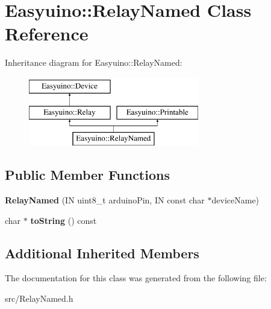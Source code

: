 \hypertarget{class_easyuino_1_1_relay_named}{}\section{Easyuino\+:\+:Relay\+Named Class Reference}
\label{class_easyuino_1_1_relay_named}
Inheritance diagram for Easyuino\+:\+:Relay\+Named\+:\begin{figure}[H]
\begin{center}
\leavevmode
\includegraphics[height=3.000000cm]{class_easyuino_1_1_relay_named}
\end{center}
\end{figure}
\subsection*{Public Member Functions}
\begin{DoxyCompactItemize}
\item 
\mbox{\label{class_easyuino_1_1_relay_named_a3def4eb321085beb48fa3e45da5e6dfc}} 
{\bfseries Relay\+Named} (IN uint8\+\_\+t arduino\+Pin, IN const char $\ast$device\+Name)
\item 
\mbox{\label{class_easyuino_1_1_relay_named_a1e9e82e563baaba5055ee9335551a306}} 
char $\ast$ {\bfseries to\+String} () const
\end{DoxyCompactItemize}
\subsection*{Additional Inherited Members}


The documentation for this class was generated from the following file\+:\begin{DoxyCompactItemize}
\item 
src/Relay\+Named.\+h\end{DoxyCompactItemize}
